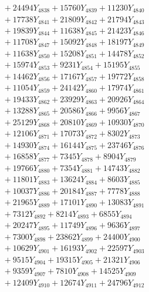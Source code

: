 \documentclass[a4paper,10pt]{article}
\begin{document}
{\begin{align}
&\;  + 24494 Y_{4838} + 15760 Y_{4839} + 11230 Y_{4840} \\[0.3ex]
&\;  + 17738 Y_{4841} + 21809 Y_{4842} + 21794 Y_{4843} \\[0.3ex]
&\;  + 19839 Y_{4844} + 11638 Y_{4845} + 21423 Y_{4846} \\[0.3ex]
&\;  + 11708 Y_{4847} + 15092 Y_{4848} + 18197 Y_{4849} \\[0.3ex]
&\;  + 11638 Y_{4850} + 15208 Y_{4851} + 14478 Y_{4852} \\[0.3ex]
&\;  + 15974 Y_{4853} + 9231 Y_{4854} + 15195 Y_{4855} \\[0.3ex]
&\;  + 14462 Y_{4856} + 17167 Y_{4857} + 19772 Y_{4858} \\[0.5ex]\allowbreak
&\;  + 11054 Y_{4859} + 24142 Y_{4860} + 17974 Y_{4861} \\[0.3ex]
&\;  + 19433 Y_{4862} + 23929 Y_{4863} + 20926 Y_{4864} \\[0.3ex]
&\;  + 13288 Y_{4865} + 20586 Y_{4866} + 9956 Y_{4867} \\[0.3ex]
&\;  + 25129 Y_{4868} + 20810 Y_{4869} + 10930 Y_{4870} \\[0.3ex]
&\;  + 12106 Y_{4871} + 17073 Y_{4872} + 8302 Y_{4873} \\[0.3ex]
&\;  + 14930 Y_{4874} + 16144 Y_{4875} + 23746 Y_{4876} \\[0.3ex]
&\;  + 16858 Y_{4877} + 7345 Y_{4878} + 8904 Y_{4879} \\[0.3ex]
&\;  + 19766 Y_{4880} + 7354 Y_{4881} + 14743 Y_{4882} \\[0.3ex]
&\;  + 11801 Y_{4883} + 13624 Y_{4884} + 8603 Y_{4885} \\[0.3ex]
&\;  + 10037 Y_{4886} + 20184 Y_{4887} + 7778 Y_{4888} \\[0.5ex]\allowbreak
&\;  + 21965 Y_{4889} + 17101 Y_{4890} + 13083 Y_{4891} \\[0.3ex]
&\;  + 7312 Y_{4892} + 8214 Y_{4893} + 6855 Y_{4894} \\[0.3ex]
&\;  + 20247 Y_{4895} + 11749 Y_{4896} + 9636 Y_{4897} \\[0.3ex]
&\;  + 7300 Y_{4898} + 23862 Y_{4899} + 24400 Y_{4900} \\[0.3ex]
&\;  + 10629 Y_{4901} + 16193 Y_{4902} + 22597 Y_{4903} \\[0.3ex]
&\;  + 9515 Y_{4904} + 19315 Y_{4905} + 21321 Y_{4906} \\[0.3ex]
&\;  + 9359 Y_{4907} + 7810 Y_{4908} + 14525 Y_{4909} \\[0.3ex]
&\;  + 12409 Y_{4910} + 12674 Y_{4911} + 24796 Y_{4912} \\[0.3ex]

\end{align}}
\end{document}
